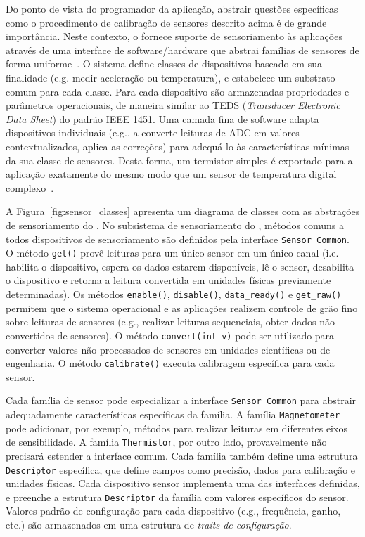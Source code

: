 Do ponto de vista do programador da aplicação, abstrair questões específicas
como o procedimento de calibração de sensores descrito acima é de grande
importância. Neste contexto, o \epos fornece suporte de sensoriamento às
aplicações através de uma interface de software/hardware que abstrai famílias de
sensores de forma uniforme~\cite{Wanner:ETFA:2006}. O sistema define classes de
dispositivos baseado em sua finalidade (e.g. medir aceleração ou temperatura), e
estabelece um substrato comum para cada classe. Para cada dispositivo são
armazenadas propriedades e parâmetros operacionais, de maneira similar ao TEDS
(\textit{Transducer Electronic Data Sheet}) do padrão IEEE 1451. Uma camada fina
de software adapta dispositivos individuais (e.g., a converte leituras de ADC em
valores contextualizados, aplica as correções) para adequá-lo às características
mínimas da sua classe de sensores. Desta forma, um termistor simples é exportado
para a aplicação exatamente do mesmo modo que um sensor de temperatura digital
complexo~\cite{Wanner:JCC:2008}.


A Figura~\ref{fig:sensor_classes} apresenta um diagrama de classes com as
abstrações de sensoriamento do \epos. No subsistema de sensoriamento do \epos,
métodos comuns a todos dispositivos de sensoriamento são definidos pela
interface \texttt{Sensor\_Common}. O método \texttt{get()} provê leituras para
um único sensor em um único canal (i.e. habilita o dispositivo, espera os dados
estarem disponíveis, lê o sensor, desabilita o dispositivo e retorna a leitura
convertida em unidades físicas previamente determinadas). Os métodos
\texttt{enable()}, \texttt{disable()}, \texttt{data\_ready()} e
\texttt{get\_raw()} permitem que o sistema operacional e as aplicações realizem
controle de grão fino sobre leituras de sensores (e.g., realizar leituras
sequenciais, obter dados não convertidos de sensores). O método
\texttt{convert(int v)} pode ser utilizado para converter valores não
processados de sensores em unidades científicas ou de engenharia. O método
\texttt{calibrate()} executa calibragem específica para cada sensor.

Cada família de sensor pode especializar a interface \texttt{Sensor\_Common}
para abstrair adequadamente características específicas da família. A família
\texttt{Magnetometer} pode adicionar, por exemplo, métodos para realizar
leituras em diferentes eixos de sensibilidade. A família \texttt{Thermistor},
por outro lado, provavelmente não precisará estender a interface comum. Cada
família também define uma estrutura \texttt{Descriptor} específica, que define
campos como precisão, dados para calibração e unidades físicas. Cada dispositivo
sensor implementa uma das interfaces definidas, e preenche a estrutura
\texttt{Descriptor} da família com valores específicos do sensor. Valores padrão
de configuração para cada dispositivo (e.g., frequência, ganho, etc.) são
armazenados em uma estrutura de \emph{traits de configuração}.

